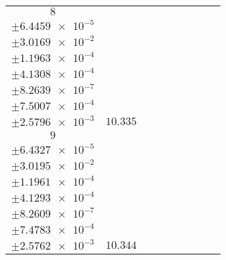 \documentclass[8pt]{article}
\begin{document}
\begin{longtable}[l]{c c c c c c c c c}
$\num{8}$ & \begin{tabular}[c]{@{}c@{}}$\num{0.12294}$ \\ $\pm\num{6.4459e-5}$\end{tabular} & \begin{tabular}[c]{@{}c@{}}$\num{-0.31052}$ \\ $\pm\num{3.0169e-2}$\end{tabular} & \begin{tabular}[c]{@{}c@{}}$\num{-5.2045}$ \\ $\pm\num{1.1963e-4}$\end{tabular} & \begin{tabular}[c]{@{}c@{}}$\num{1.9242e+3}$ \\ $\pm\num{4.1308e-4}$\end{tabular} & \begin{tabular}[c]{@{}c@{}}$\num{3.8495}$ \\ $\pm\num{8.2639e-7}$\end{tabular} & \begin{tabular}[c]{@{}c@{}}$\num{1.1775}$ \\ $\pm\num{7.5007e-4}$\end{tabular} & \begin{tabular}[c]{@{}c@{}}$\num{4.248}$ \\ $\pm\num{2.5796e-3}$\end{tabular} & $\num{10.335}$\\
$\num{9}$ & \begin{tabular}[c]{@{}c@{}}$\num{0.12277}$ \\ $\pm\num{6.4327e-5}$\end{tabular} & \begin{tabular}[c]{@{}c@{}}$\num{0.21548}$ \\ $\pm\num{3.0195e-2}$\end{tabular} & \begin{tabular}[c]{@{}c@{}}$\num{5.205}$ \\ $\pm\num{1.1961e-4}$\end{tabular} & \begin{tabular}[c]{@{}c@{}}$\num{1.9346e+3}$ \\ $\pm\num{4.1293e-4}$\end{tabular} & \begin{tabular}[c]{@{}c@{}}$\num{3.8704}$ \\ $\pm\num{8.2609e-7}$\end{tabular} & \begin{tabular}[c]{@{}c@{}}$\num{1.1752}$ \\ $\pm\num{7.4783e-4}$\end{tabular} & \begin{tabular}[c]{@{}c@{}}$\num{4.2442}$ \\ $\pm\num{2.5762e-3}$\end{tabular} & $\num{10.344}$\\

\end{longtable}
\end{document}

